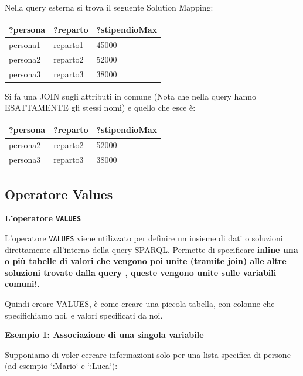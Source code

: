 Nella query esterna si trova il seguente Solution Mapping: 

\begin{table}[h!]
\centering
\begin{tabular}{|l|l|l|}
\hline
\textbf{?persona} & \textbf{?reparto} & \textbf{?stipendioMax} \\ \hline
persona1 & reparto1 & 45000 \\ \hline
persona2 & reparto2 & 52000 \\ \hline
persona3 & reparto3 & 38000 \\ \hline
\end{tabular}
\end{table} 

Si fa una JOIN sugli attributi in comune (Nota che nella query hanno ESATTAMENTE gli stessi nomi) e quello che esce è: 

\begin{table}[h!]
\centering
\begin{tabular}{|l|l|l|}
\hline
\textbf{?persona} & \textbf{?reparto} & \textbf{?stipendioMax} \\ \hline
persona2 & reparto2 & 52000 \\ \hline
persona3 & reparto3 & 38000 \\ \hline
\end{tabular}
\end{table} 


\newpage

\subsection{Operatore Values}

\textbf{L'operatore \texttt{VALUES}}

L'operatore \texttt{VALUES} viene utilizzato per definire un insieme di dati o soluzioni direttamente all'interno della query SPARQL. Permette di specificare \textbf{inline una o più tabelle di valori che vengono poi unite (tramite join) alle altre soluzioni trovate dalla query
, queste vengono unite sulle variabili comuni!}.

Quindi creare VALUES, è come creare una piccola tabella, con colonne che specifichiamo noi, e valori specificati da noi.

\textbf{Esempio 1: Associazione di una singola variabile}

Supponiamo di voler cercare informazioni solo per una lista specifica di persone (ad esempio `:Mario` e `:Luca`):

